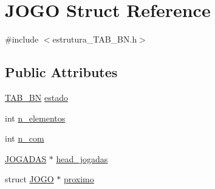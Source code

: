 \hypertarget{structJOGO}{\section{J\-O\-G\-O Struct Reference}
\label{structJOGO}
}


{\ttfamily \#include $<$estrutura\-\_\-\-T\-A\-B\-\_\-\-B\-N.\-h$>$}

\subsection*{Public Attributes}
\begin{DoxyCompactItemize}
\item 
\hyperlink{estrutura__TAB__BN_8h_a71a4477e2433da6b70d13b4c01b28917}{T\-A\-B\-\_\-\-B\-N} \hyperlink{structJOGO_a8be710a209c24ac0f77dc6ec345131c0}{estado}
\item 
int \hyperlink{structJOGO_a207d5e6dc2e307c6ecabe6d593b06a35}{n\-\_\-elementos}
\item 
int \hyperlink{structJOGO_a8a2e1124aa5a80bca5be947df1d1d5e4}{n\-\_\-com}
\item 
\hyperlink{structJOGADAS}{J\-O\-G\-A\-D\-A\-S} $\ast$ \hyperlink{structJOGO_ae6a10fd45e48577ebe24ce85f0d3ce66}{head\-\_\-jogadas}
\item 
struct \hyperlink{structJOGO}{J\-O\-G\-O} $\ast$ \hyperlink{structJOGO_a2657c0fd23964f1adde229f158aa73bd}{proximo}
\end{DoxyCompactItemize}


